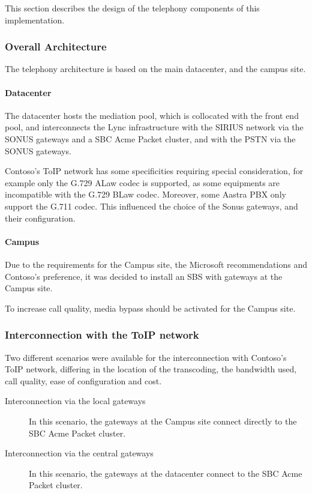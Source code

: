 This section describes the design of the telephony components of this implementation.

\subsubsection{Overall Architecture}
	The telephony architecture is based on the main datacenter, and the campus site.

	\paragraph{Datacenter}
	The datacenter hosts the mediation pool, which is collocated with the front end pool, and interconnects the Lync infrastructure with the SIRIUS network via the SONUS gateways and a SBC Acme Packet cluster, and with the PSTN via the SONUS gateways.
	
	Contoso's ToIP network has some specificities requiring special consideration, for example only the G.729 ALaw codec is supported, as some equipments are incompatible with the G.729 BLaw codec. Moreover, some Aastra PBX only support the G.711 codec. This influenced the choice of the Sonus gateways, and their configuration.
	

	\paragraph{Campus}
	Due to the requirements for the Campus site, the Microsoft recommendations and Contoso's preference, it was decided to install an SBS with gateways at the Campus site.
	
	To increase call quality, media bypass should be activated for the Campus site.


\subsubsection{Interconnection with the ToIP network}
	Two different scenarios were available for the interconnection with Contoso's ToIP network, differing in the location of the transcoding, the bandwidth used, call quality, ease of configuration and cost.
	\begin{description}
		\item[Interconnection via the local gateways] 
			In this scenario, the gateways at the Campus site connect directly to the SBC Acme Packet cluster.
		\item[Interconnection via the central gateways] 
			In this scenario, the gateways at the datacenter connect to the SBC Acme Packet cluster.
	\end{description}
	
